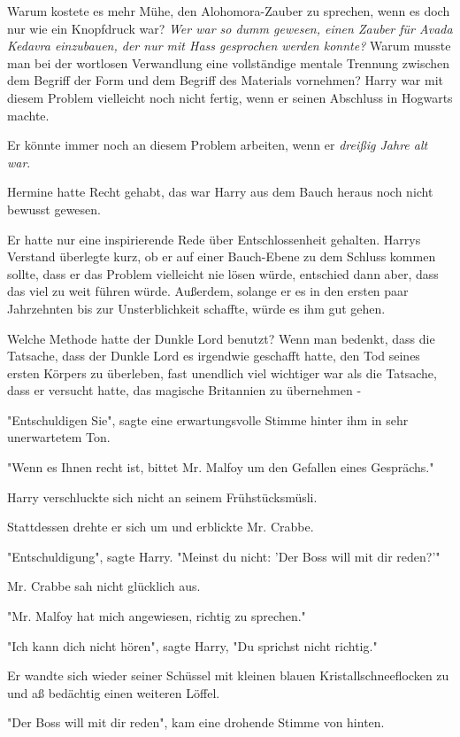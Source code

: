 {Warum kostete es mehr Mühe, den Alohomora-Zauber zu sprechen, wenn es doch nur wie ein Knopfdruck war? \emph{Wer war so dumm gewesen, einen Zauber für Avada Kedavra einzubauen, der nur mit Hass gesprochen werden konnte?} Warum musste man bei der wortlosen Verwandlung eine vollständige mentale Trennung zwischen dem Begriff der Form und dem Begriff des Materials vornehmen? Harry war mit diesem Problem vielleicht noch nicht fertig, wenn er seinen Abschluss in Hogwarts machte.

Er könnte immer noch an diesem Problem arbeiten, wenn er \emph{dreißig Jahre alt war}.

Hermine hatte Recht gehabt, das war Harry aus dem Bauch heraus noch nicht bewusst gewesen.

Er hatte nur eine inspirierende Rede über Entschlossenheit gehalten. Harrys Verstand überlegte kurz, ob er auf einer Bauch-Ebene zu dem Schluss kommen sollte, dass er das Problem vielleicht nie lösen würde, entschied dann aber, dass das viel zu weit führen würde. Außerdem, solange er es in den ersten paar Jahrzehnten bis zur Unsterblichkeit schaffte, würde es ihm gut gehen.

Welche Methode hatte der Dunkle Lord benutzt? Wenn man bedenkt, dass die Tatsache, dass der Dunkle Lord es irgendwie geschafft hatte, den Tod seines ersten Körpers zu überleben, fast unendlich viel wichtiger war als die Tatsache, dass er versucht hatte, das magische Britannien zu übernehmen -

"Entschuldigen Sie", sagte eine erwartungsvolle Stimme hinter ihm in sehr unerwartetem Ton.

"Wenn es Ihnen recht ist, bittet Mr. Malfoy um den Gefallen eines Gesprächs."

Harry verschluckte sich nicht an seinem Frühstücksmüsli.

Stattdessen drehte er sich um und erblickte Mr. Crabbe.

"Entschuldigung", sagte Harry. "Meinst du nicht: 'Der Boss will mit dir reden?'"

Mr. Crabbe sah nicht glücklich aus.

"Mr. Malfoy hat mich angewiesen, richtig zu sprechen."

"Ich kann dich nicht hören", sagte Harry, "Du sprichst nicht richtig."

Er wandte sich wieder seiner Schüssel mit kleinen blauen Kristallschneeflocken zu und aß bedächtig einen weiteren Löffel.

"Der Boss will mit dir reden", kam eine drohende Stimme von hinten.

}
